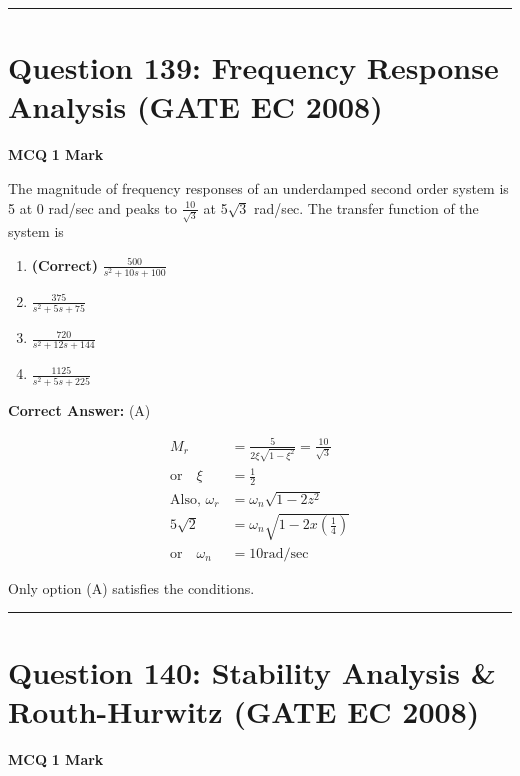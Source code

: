 \documentclass[11pt,a4paper]{article}
\begin{document}
\vspace{1.5em}
\hrule
\vspace{1.5em}

\section*{Question 139: Frequency Response Analysis (GATE EC 2008)}
\noindent \textbf{\color{primary}MCQ} \hfill \textbf{\color{secondary}1 Mark}


\noindent The magnitude of frequency responses of an underdamped second order system
is 5 at 0 rad/sec and peaks to $\frac{10}{\sqrt{3}}$ at 5$\sqrt{3}$
rad/sec. The transfer function of the system is


\begin{enumerate}[label=(\Alph*)]
    \item \textbf{(Correct)} $\frac{500}{s^{2}+10s+100}$
    \item $\frac{375}{s^{2}+5s+75}$
    \item $\frac{720}{s^{2}+12s+144}$
    \item $\frac{1125}{s^{2}+5s+225}$
\end{enumerate}

\noindent \textbf{Correct Answer:} (A)

\begin{tcolorbox}[solbox, title=Detailed Solution -- Question 139]
\[
\begin{aligned} M_{r}&=\frac{5}{2 \xi \sqrt{1-\xi^{2}}}=\frac{10}{\sqrt{3}} \\ \text{or}\quad\xi&=\frac{1}{2}\\ \text{Also, }\omega_{r}&=\omega_{n} \sqrt{1-2 z^{2}} \\ 5 \sqrt{2} &=\omega_{n} \sqrt{1-2 x\left(\frac{1}{4}\right)} \\ \text{or}\quad\omega_{n} &=10 \mathrm{rad} / \mathrm{sec} \end{aligned}
\]

 Only option (A) satisfies the conditions.
\end{tcolorbox}

\vspace{1.5em}
\hrule
\vspace{1.5em}

\section*{Question 140: Stability Analysis \& Routh-Hurwitz (GATE EC 2008)}
\noindent \textbf{\color{primary}MCQ} \hfill \textbf{\color{secondary}1 Mark}
\end{document}
